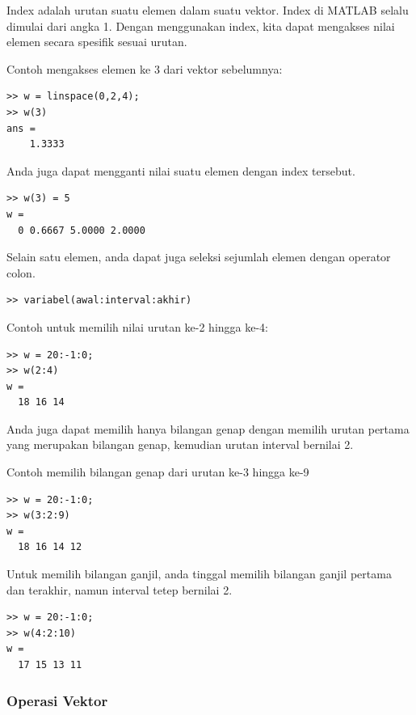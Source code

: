 \documentclass[12pt]{book}
\begin{document}
	Index adalah urutan suatu elemen dalam suatu vektor.
	Index di MATLAB selalu dimulai dari angka 1.
	Dengan menggunakan index, kita dapat mengakses nilai elemen secara spesifik sesuai urutan.
	
	Contoh mengakses elemen ke 3 dari vektor sebelumnya:
	\begin{verbatim}
>> w = linspace(0,2,4);
>> w(3)
ans = 
    1.3333
	\end{verbatim}

	Anda juga dapat mengganti nilai suatu elemen dengan index tersebut.
	\begin{verbatim}
>> w(3) = 5
w =
  0 0.6667 5.0000 2.0000
	\end{verbatim}

	Selain satu elemen, anda dapat juga seleksi sejumlah elemen dengan operator colon.
	\begin{verbatim}
>> variabel(awal:interval:akhir)
	\end{verbatim}

	Contoh untuk memilih nilai urutan ke-2 hingga ke-4:
	\begin{verbatim}
>> w = 20:-1:0;
>> w(2:4)
w =
  18 16 14
	\end{verbatim}

	Anda juga dapat memilih hanya bilangan genap dengan memilih urutan pertama yang merupakan bilangan genap,
	kemudian urutan interval bernilai 2.
	
	Contoh memilih bilangan genap dari urutan ke-3 hingga ke-9
	\begin{verbatim}
>> w = 20:-1:0;
>> w(3:2:9)
w =
  18 16 14 12
	\end{verbatim}

	Untuk memilih bilangan ganjil, anda tinggal memilih bilangan ganjil pertama dan terakhir, namun interval tetep bernilai 2.
	\begin{verbatim}
>> w = 20:-1:0;
>> w(4:2:10)
w =
  17 15 13 11
	\end{verbatim}
	
	\newpage
	\subsubsection{Operasi Vektor}
	
\end{document}
